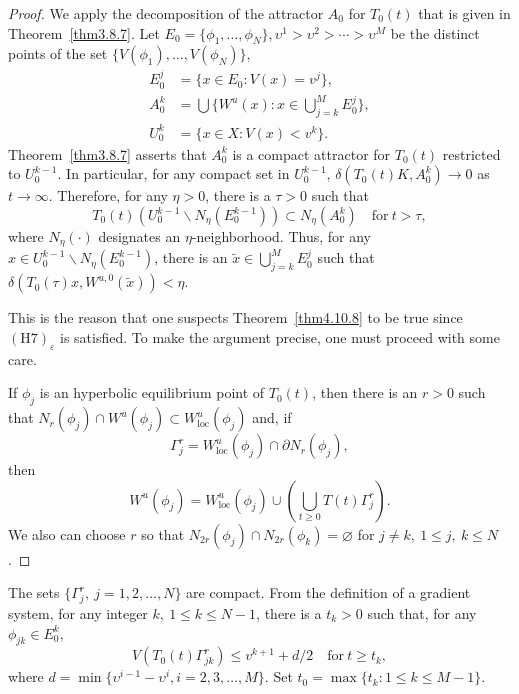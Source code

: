 \documentclass{surv-l}
\theoremstyle{plain}
\theoremstyle{definition}
\numberwithin{equation}{section}
\numberwithin{figure}{chapter}
\begin{document}
\begin{proof}\label{pot4.10.8} We apply the decomposition of the attractor $A_{0}$ for $T_{0}(t)$ that is given in Theorem~\ref{thm3.8.7}. Let $E_{0}=\{\phi_{1},\ldots,\phi_{N}\},\upsilon^{1}>\upsilon^{2}> \cdots>\upsilon^{M}$ be the distinct points of the set $\{V(\phi_{1}),\ldots,V(\phi_{N})\}$,
\begin{align*}
E_{0}^{j}&=\{x\in E_{0}:V(x)=v^{j}\},\\
A_{0}^{k}&=\bigcup\{W^{u}(x):x\in\bigcup_{j=k}^{M}E_{0}^{j}\},\\
U_{0}^{k}&=\{x\in X:V(x)<v^{k}\}.
\end{align*}
Theorem~\ref{thm3.8.7} asserts that $A_{0}^{k}$ is a compact attractor for $T_{0}(t)$ restricted to $U_{0}^{k-1}$. In particular, for any compact set in $U_{0}^{k-1},\,\delta(T_{0}(t)K, A_{0}^{k})\rightarrow 0$ as $ t\rightarrow\infty$. Therefore, for any $\eta>0$, there is a $\tau>0$ such that
\begin{equation*}
T_{0}(t)(U_{0}^{k-1}\backslash N_{\eta}(E_{0}^{k-1}))\subset N_{\eta}(A_{0}^{k})\quad \mathrm{for}\ t>\tau,
\end{equation*}
where $N_{\eta}(\cdot)$ designates an $\eta$-neighborhood. Thus, for any $x\in U_{0}^{k-1}\backslash N_{\eta}(E_{0}^{k-1})$, there is an $\tilde{x}\in\bigcup_{j=k}^{M}E_{0}^{j}$ such that $\delta(T_{0}(\tau)x,W^{u,0}(\tilde{x}))<\eta$.

This is the reason that one suspects Theorem~\ref{thm4.10.8} to be true since $\mathrm{(H7)}_{\varepsilon}$ is satisfied. To make the argument precise, one must proceed with some care.

If $\phi_{j}$ is an hyperbolic equilibrium point of $T_{0}(t)$, then there is an $r>0$ such that $N_{r}(\phi_{j})\cap W^{u}(\phi_{j})\subset W_{\mathrm{loc}}^{u}(\phi_{j})$ and, if
\begin{equation*}
\Gamma_{j}^{r}=W_{\mathrm{loc}}^{u}(\phi_{j})\cap\partial N_{r}(\phi_{j}),
\end{equation*}
then
\begin{equation}\label{chap04:eq10.18}
W^{u}(\phi_{j})=W_{\mathrm{loc}}^{u}(\phi_{j})\cup(\bigcup_{t\geq 0}T(t)\Gamma_{j}^{r}).
\end{equation}
We also can choose $r$ so that $ N_{2r}(\phi_{j})\cap N_{2r}(\phi_{k})={\varnothing}$ for $j\neq k,\ 1\leq j,\ k\leq N$. \end{proof}

The sets $\{\Gamma_{j}^{r},\ j=1, 2,\ldots, N\}$ are compact. From the definition of a gradient system, for any integer $k,\ 1\leq k\leq N-1$, there is a $t_{k}>0$ such that, for any $\phi_{jk}\in E_{0}^{k}$,
\begin{equation}\label{chap04:eq10.19}
V(T_{0}(t)\Gamma_{jk}^{r})\leq v^{k+1}+d/2\quad \mathrm{for}\ t\geq t_{k},
\end{equation}
where $d=\min\{\upsilon^{i-1}-\upsilon^{i},i=2,3,\ldots,M\}$. Set $t_{0}=\max\{t_{k}:1\leq k\leq M-1\}$.
\end{document}
